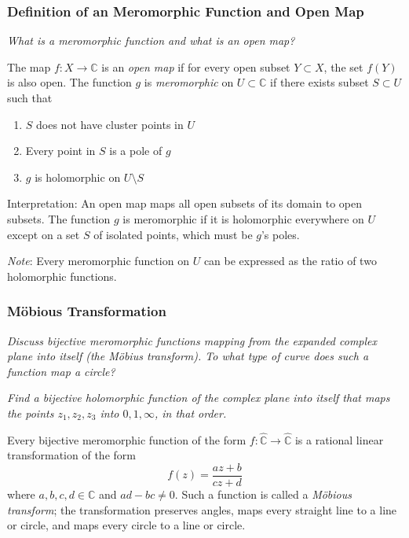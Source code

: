 \documentclass[11pt, a4paper]{article}
\newcommand{\question}[1]{\textit{#1}\vspace{2mm}}
\newcommand{\C}{\mathbb{C}} %
\begin{document}
\subsubsection{Definition of an Meromorphic Function and Open Map}
\question{What is a meromorphic function and what is an open map?}

The map $ f:X \to \C $ is an \textit{open map} if for every open subset $ Y \subset X $, the set $ f(Y) $ is also open. The function $ g $ is \textit{meromorphic} on $ U \subset \C $ if there exists subset $ S \subset U $  such that
\begin{enumerate}
	\item $ S $ does not have cluster points in $ U $
	\item Every point in $ S $ is a pole of $ g $
	\item $ g $ is holomorphic on $ U \setminus S $
\end{enumerate}
Interpretation: An open map maps all open subsets of its domain to open subsets. The function $ g $ is meromorphic if it is holomorphic everywhere on $ U $ except on a set $ S $ of isolated points, which must be $ g $'s poles.

\vspace{2mm}
\textit{Note}: Every meromorphic function on $ U $ can be expressed as the ratio of two holomorphic functions.

\subsubsection{M\"obious Transformation}
\question{Discuss bijective meromorphic functions mapping from the expanded complex plane into itself (the M\"{o}bius transform). To what type of curve does such a function map a circle?}

\question{Find a bijective holomorphic function of the complex plane into itself that maps the points $ z_1, z_{2}, z_{3} $ into $ 0, 1, \infty $, in that order.}


Every bijective meromorphic function of the form $ f : \hat{\C} \to \hat{\C} $ is a rational linear transformation of the form
\begin{equation*}
	f(z) = \frac{az + b}{cz + d}
\end{equation*}
where $ a, b, c, d \in \C $ and $ ad - bc \neq 0 $. Such a function is called a \textit{M\"obious transform}; the transformation preserves angles, maps every straight line to a line or circle, and maps every circle to a line or circle.
\end{document}
